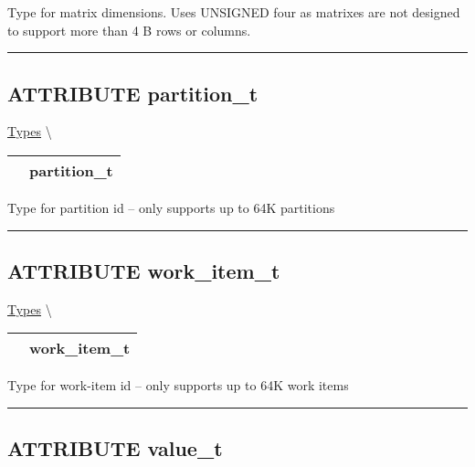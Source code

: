 \par
Type for matrix dimensions. Uses UNSIGNED four as matrixes are not designed to support more than 4 B rows or columns.


\rule{\linewidth}{0.5pt}
\subsection*{\textsf{\colorbox{headtoc}{\color{white} ATTRIBUTE}
partition\_t}}

\hypertarget{ecldoc:pbblas.types.partition_t}{}
\hspace{0pt} \hyperlink{ecldoc:PBblas.Types}{Types} \textbackslash 

{\renewcommand{\arraystretch}{1.5}
\begin{tabularx}{\textwidth}{|>{\raggedright\arraybackslash}l|X|}
\hline
\hspace{0pt}\mytexttt{\color{red} } & \textbf{partition\_t} \\
\hline
\end{tabularx}
}

\par
Type for partition id -- only supports up to 64K partitions


\rule{\linewidth}{0.5pt}
\subsection*{\textsf{\colorbox{headtoc}{\color{white} ATTRIBUTE}
work\_item\_t}}

\hypertarget{ecldoc:pbblas.types.work_item_t}{}
\hspace{0pt} \hyperlink{ecldoc:PBblas.Types}{Types} \textbackslash 

{\renewcommand{\arraystretch}{1.5}
\begin{tabularx}{\textwidth}{|>{\raggedright\arraybackslash}l|X|}
\hline
\hspace{0pt}\mytexttt{\color{red} } & \textbf{work\_item\_t} \\
\hline
\end{tabularx}
}

\par
Type for work-item id -- only supports up to 64K work items


\rule{\linewidth}{0.5pt}
\subsection*{\textsf{\colorbox{headtoc}{\color{white} ATTRIBUTE}
value\_t}}

